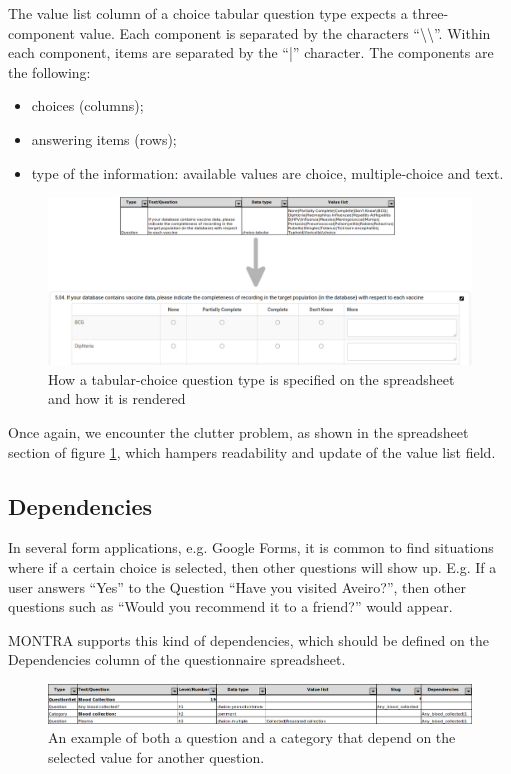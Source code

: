 The value list column of a choice tabular question type expects a three-component value.
Each component is separated by the characters ``\textbackslash\textbackslash''.
Within each component, items are separated by the ``|'' character.
The components are the following:

\begin{itemize}
    \item choices (columns);
    \item answering items (rows);
    \item type of the information: available values are choice, multiple-choice and text.
\end{itemize}

\begin{figure}[H]
    \center
    \includegraphics[width=\textwidth]{choice-tabular}
    \caption{How a tabular-choice question type is specified on the spreadsheet and how it is rendered}
    \label{fig:choice-tabular}
\end{figure}

Once again, we encounter the clutter problem, as shown in the spreadsheet section of figure \ref{fig:choice-tabular}, which hampers readability and update of the value list field.

\subsection*{Dependencies}

In several form applications, e.g. Google Forms, it is common to find situations where if a certain choice is selected, then other questions will show up.
E.g. If a user answers ``Yes'' to the Question ``Have you visited Aveiro?'', then other questions such as ``Would you recommend it to a friend?'' would appear.

MONTRA supports this kind of dependencies, which should be defined on the Dependencies column of the questionnaire spreadsheet.

\begin{figure}[H]
    \center
    \includegraphics[width=\linewidth]{dependencies-excel}
    \caption{An example of both a question and a category that depend on the selected value for another question.}
    \label{fig:dependencies-excel}
\end{figure}

